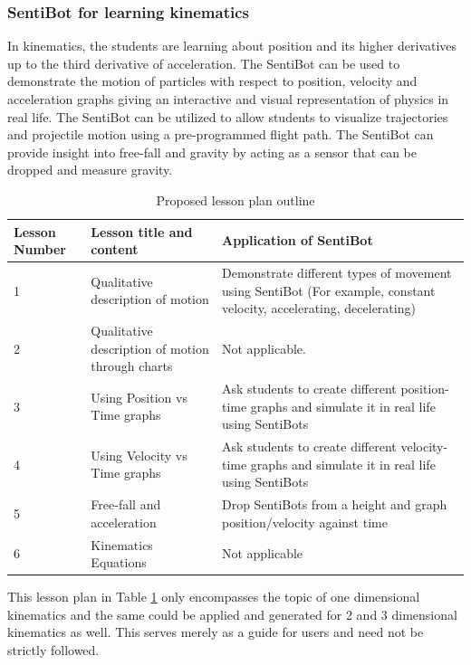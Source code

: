 \documentclass[12pt]{article}
\begin{document}
\subsubsection{SentiBot for learning kinematics}

In kinematics, the students are learning about position and its higher derivatives up to the third derivative of acceleration. The SentiBot can be used to demonstrate the motion of particles with respect to position, velocity and acceleration graphs giving an interactive and visual representation of physics in real life.  The SentiBot can be utilized to allow students to visualize trajectories and projectile motion using a pre-programmed flight path. The SentiBot can provide insight into free-fall and gravity by acting as a sensor that can be dropped and measure gravity.

\begin{table}[h]
	\centering
	\begin{tabularx}{\linewidth}{ | >{\setlength\hsize{.2\hsize}} X | >{\setlength\hsize{.5\hsize}} X | X | }
		Lesson Number & Lesson title and content & Application of SentiBot \\
		\hline
		1 & Qualitative description of motion & Demonstrate different types of movement using SentiBot (For example, constant velocity, accelerating, decelerating) \\
		2 & Qualitative description of motion through charts & Not applicable. \\
		3 & Using Position vs Time graphs & Ask students to create different position-time graphs and simulate it in real life using SentiBots \\
		4 & Using Velocity vs Time graphs & Ask students to create different velocity-time graphs and simulate it in real life using SentiBots \\
		5 & Free-fall and acceleration & Drop SentiBots from a height and graph position/velocity against time \\
		6 & Kinematics Equations & Not applicable \\
	\end{tabularx}
	\caption{Proposed lesson plan outline}
	\label{tab:lessonplan}
\end{table}

This lesson plan in Table \ref{tab:lessonplan} only encompasses the topic of one dimensional kinematics and the same could be applied and generated for 2 and 3 dimensional kinematics as well. This serves merely as a guide for users and need not be strictly followed.
\end{document}
